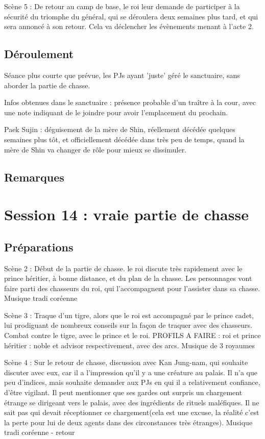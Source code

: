 \documentclass[10pt,a4paper]{book}
\begin{document}
Scène 5 : De retour au camp de base, le roi leur demande de participer à la sécurité du triomphe du général, qui se déroulera deux semaines plus tard, et qui sera annoncé à son retour. Cela va déclencher les évènements menant à l'acte 2.
\subsection{Déroulement}

Séance plus courte que prévue, les PJs ayant 'juste' géré le sanctuaire, sans aborder la partie de chasse.

Infos obtenues dans le sanctuaire : présence probable d'un traître à la cour, avec une note indiquant de le joindre pour avoir l'emplacement du prochain.

Paek Sujin : déguisement de la mère de Shin, réellement décédée quelques semaines plus tôt, et officiellement décédée dans très peu de temps, quand la mère de Shin va changer de rôle pour mieux se dissimuler.
\subsection{Remarques}
\section{Session 14 : vraie partie de chasse}
\subsection{Préparations}
Scène 2 : Début de la partie de chasse. le roi discute très rapidement avec le prince héritier, à bonne distance, et du plan de la chasse. Les personnages vont faire parti des chasseurs du roi, qui l'accompagnent pour l'assister dans sa chasse. Musique tradi coréenne

Scène 3 : Traque d'un tigre, alors que le roi est accompagné par le prince cadet, lui prodiguant de nombreux conseils sur la façon de traquer avec des chasseurs. Combat contre le tigre, avec le prince et le roi. PROFILS A FAIRE : roi et prince héritier : noble et advisor respectivement, avec des arcs. Musique de 3 royaumes

Scène 4 : Sur le retour de chasse, discussion avec Kan Jung-nam, qui souhaite discuter avec eux, car il a l'impression qu'il y a une créature au palais. Il n'a que peu d'indices, mais souhaite demander aux PJs en qui il a relativement confiance, d'être vigilant. Il peut mentionner que ses gardes ont surpris un chargement étrange se dirigeant vers le palais, avec des ingrédients de rituels maléfiques. Il ne sait pas qui devait réceptionner ce chargement(cela est une excuse, la réalité c'est la perte pour lui de deux agents dans des circonstances très étranges). Musique tradi coréenne - retour
\end{document}
